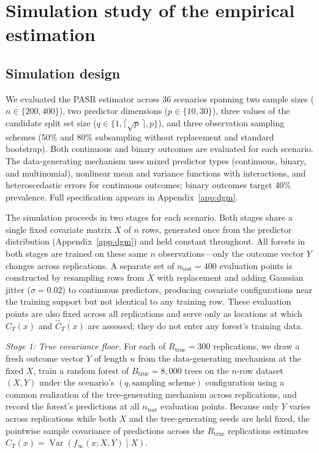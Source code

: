 \documentclass[11pt]{article}
\theoremstyle{plain}
\theoremstyle{definition}
\theoremstyle{remark}
\DeclareMathOperator{\Var}{Var}
\begin{document}
\section{Simulation study of the empirical estimation}
\label{sec:simulations}

\subsection{Simulation design}
\label{subsec:sim_design}

We evaluated the PASR estimator across 36 scenarios spanning two sample sizes ($n \in \{200, 400\}$), two predictor dimensions ($p \in \{10, 30\}$), three values of the candidate split set size ($q \in \{1, \lceil\sqrt{p}\,\rceil, p\}$), and three observation sampling schemes (50\% and 80\% subsampling without replacement and standard bootstrap). Both continuous and binary outcomes are evaluated for each scenario. The data-generating mechanism uses mixed predictor types (continuous, binary, and multinomial), nonlinear mean and variance functions with interactions, and heteroscedastic errors for continuous outcomes; binary outcomes target 40\% prevalence. Full specification appears in Appendix~\ref{app:dgm}.

The simulation proceeds in two stages for each scenario. Both stages share a single fixed covariate matrix $X$ of $n$ rows, generated once from the predictor distribution (Appendix~\ref{app:dgm}) and held constant throughout. All forests in both stages are trained on these same $n$ observations---only the outcome vector $Y$ changes across replications. A separate set of $n_{\mathrm{test}} = 400$ evaluation points is constructed by resampling rows from $X$ with replacement and adding Gaussian jitter ($\sigma = 0.02$) to continuous predictors, producing covariate configurations near the training support but not identical to any training row. These evaluation points are also fixed across all replications and serve only as locations at which $C_T(x)$ and $\widehat C_T(x)$ are assessed; they do not enter any forest's training data.

\medskip
\noindent\textit{Stage 1: True covariance floor.}\quad
For each of $R_{\mathrm{true}} = 300$ replications, we draw a fresh outcome vector $Y$ of length $n$ from the data-generating mechanism at the fixed $X$, train a random forest of $B_{\mathrm{true}} = 8{,}000$ trees on the $n$-row dataset $(X, Y)$ under the scenario's $(q, \text{sampling scheme})$ configuration using a common realization of the tree-generating mechanism across replications, and record the forest's predictions at all $n_{\mathrm{test}}$ evaluation points. Because only $Y$ varies across replications while both $X$ and the tree-generating seeds are held fixed, the pointwise sample covariance of predictions across the $R_{\mathrm{true}}$ replications estimates $C_T(x) = \Var(f_\infty(x; X, Y) \mid X)$.
\end{document}
